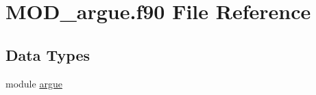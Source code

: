 \hypertarget{MOD__argue_8f90}{\section{M\-O\-D\-\_\-argue.\-f90 File Reference}
\label{MOD__argue_8f90}
}
\subsection*{Data Types}
\begin{DoxyCompactItemize}
\item 
module \hyperlink{classargue}{argue}
\end{DoxyCompactItemize}
